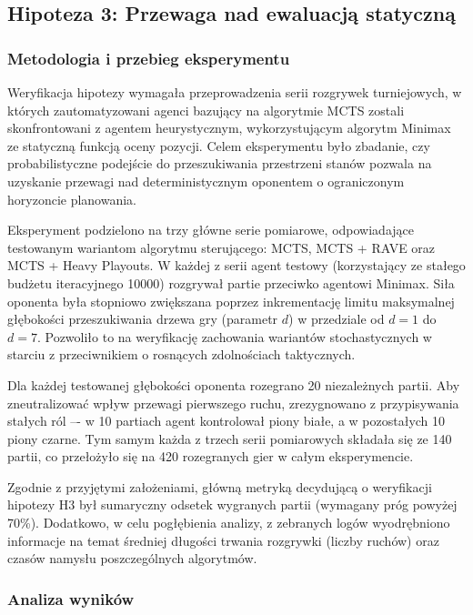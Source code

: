 \documentclass{article}
\begin{document}
\newpage
\subsection{Hipoteza 3: Przewaga nad ewaluacją statyczną}

\subsubsection{Metodologia i przebieg eksperymentu}

Weryfikacja hipotezy wymagała przeprowadzenia serii rozgrywek turniejowych, w których zautomatyzowani agenci bazujący na algorytmie MCTS zostali skonfrontowani z agentem heurystycznym, wykorzystującym algorytm Minimax ze statyczną funkcją oceny pozycji. Celem eksperymentu było zbadanie, czy probabilistyczne podejście do przeszukiwania przestrzeni stanów pozwala na uzyskanie przewagi nad deterministycznym oponentem o ograniczonym horyzoncie planowania.

Eksperyment podzielono na trzy główne serie pomiarowe, odpowiadające testowanym wariantom algorytmu sterującego: MCTS, MCTS + RAVE oraz MCTS + Heavy Playouts. W każdej z serii agent testowy (korzystający ze stałego budżetu iteracyjnego 10000) rozgrywał partie przeciwko agentowi Minimax. Siła oponenta była stopniowo zwiększana poprzez inkrementację limitu maksymalnej głębokości przeszukiwania drzewa gry (parametr $d$) w przedziale od $d=1$ do $d=7$. Pozwoliło to na weryfikację zachowania wariantów stochastycznych w starciu z przeciwnikiem o rosnących zdolnościach taktycznych.

Dla każdej testowanej głębokości oponenta rozegrano 20 niezależnych partii. Aby zneutralizować wpływ przewagi pierwszego ruchu, zrezygnowano z przypisywania stałych ról –- w 10 partiach agent kontrolował piony białe, a w pozostałych 10 piony czarne. Tym samym każda z trzech serii pomiarowych składała się ze 140 partii, co przełożyło się na 420 rozegranych gier w całym eksperymencie.

Zgodnie z przyjętymi założeniami, główną metryką decydującą o weryfikacji hipotezy H3 był sumaryczny odsetek wygranych partii (wymagany próg powyżej 70\%). Dodatkowo, w celu pogłębienia analizy, z zebranych logów wyodrębniono informacje na temat średniej długości trwania rozgrywki (liczby ruchów) oraz czasów namysłu poszczególnych algorytmów.

\subsubsection{Analiza wyników}
\end{document}
